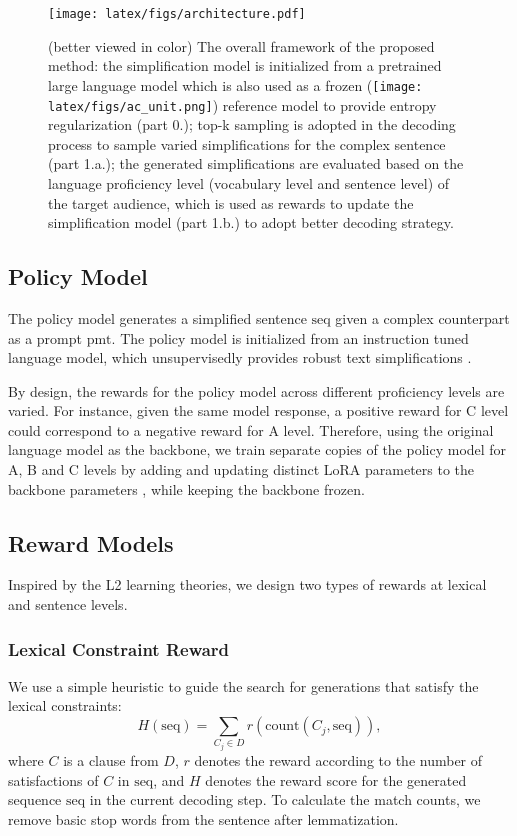 \begin{figure*}[t!]
    \centering
    \texttt{[image: latex/figs/architecture.pdf]}
    \caption{(better viewed in color) The overall framework of the proposed method: the simplification model is initialized from a pretrained large language model which is also used as a frozen (\texttt{[image: latex/figs/ac\_unit.png]}) reference model to provide entropy regularization (part 0.); top-k sampling is adopted in the decoding process to sample varied simplifications for the complex sentence (part 1.a.); the generated simplifications are evaluated based on the language proficiency level (vocabulary level and sentence level) of the target audience, which is used as rewards to update the simplification model (part 1.b.) to adopt better decoding strategy. %
    }
    \label{fig:framework}
\end{figure*}



\subsection{Policy Model}\label{sec:policy_model}
The policy model generates a simplified sentence $\text{seq}$ given a complex counterpart as a prompt $\text{pmt}$. 
The policy model is initialized from an instruction tuned language model, which unsupervisedly provides robust text simplifications \cite{kew-etal-2023-bless}.

By design, the rewards for the policy model across different proficiency levels are varied. For instance, given the same model response, a positive reward for C level could correspond to a negative reward for A level. Therefore, using the original language model as the backbone, we train separate copies of the policy model for A, B and C levels by adding and updating distinct LoRA parameters to the backbone parameters \cite{hu2022lora}, while keeping the backbone frozen. 


\subsection{Reward Models}
Inspired by the L2 learning theories, we design two types of rewards at lexical and sentence levels.

 \subsubsection{Lexical Constraint Reward}
We use a simple heuristic to guide the search for generations that satisfy the lexical constraints:
\begin{equation} \label{eq:cnt}
    H(\text{seq}) = \sum_{C_j \in D} r (\text{count}(C_j, \text{seq})),
\end{equation}
where $C$ is a clause from  $D$, 
$r$ denotes the reward according to the number of satisfactions of $C$ in $\text{seq}$, and $H$ denotes the reward score for the generated sequence $\text{seq}$ in the current decoding step.
To calculate the match counts, we remove basic stop words from the sentence after lemmatization. 


